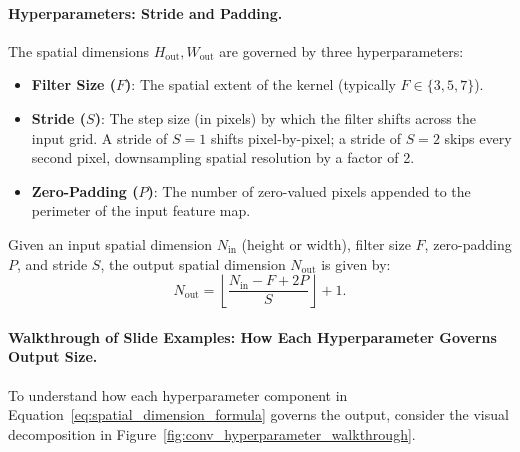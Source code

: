 \paragraph{Hyperparameters: Stride and Padding.}
The spatial dimensions $H_{\text{out}}, W_{\text{out}}$ are governed by three hyperparameters:
\begin{itemize}
  \item \textbf{Filter Size ($F$)}: The spatial extent of the kernel (typically $F \in \{3, 5, 7\}$).
  \item \textbf{Stride ($S$)}: The step size (in pixels) by which the filter shifts across the input grid. A stride of $S = 1$ shifts pixel-by-pixel; a stride of $S = 2$ skips every second pixel, downsampling spatial resolution by a factor of 2.
  \item \textbf{Zero-Padding ($P$)}: The number of zero-valued pixels appended to the perimeter of the input feature map.
\end{itemize}

\begin{theorem}
Given an input spatial dimension $N_{\text{in}}$ (height or width), filter size $F$, zero-padding $P$, and stride $S$, the output spatial dimension $N_{\text{out}}$ is given by:
\begin{equation}
N_{\text{out}} = \left\lfloor \frac{N_{\text{in}} - F + 2P}{S} \right\rfloor + 1.
\label{eq:spatial_dimension_formula}
\end{equation}
\end{theorem}

\paragraph{Walkthrough of Slide Examples: How Each Hyperparameter Governs Output Size.}
To understand how each hyperparameter component in Equation~\eqref{eq:spatial_dimension_formula} governs the output, consider the visual decomposition in Figure~\ref{fig:conv_hyperparameter_walkthrough}.


